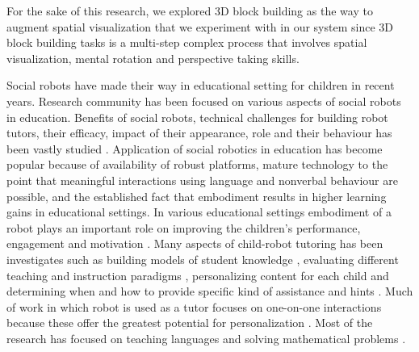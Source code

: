 \begin{enumerate}
\end{enumerate}
For the sake of this research, we explored 3D block building as the way to augment spatial visualization that we experiment with in our system since 3D block building tasks is a multi-step complex process that involves spatial visualization, mental rotation and perspective taking skills.


Social robots have made their way in educational setting for children in recent years. Research community has been focused on various aspects of social robots in education. Benefits of social robots, technical challenges for building robot tutors, their efficacy, impact of their appearance, role and their behaviour has been vastly studied \parencite{belpaeme2018social}. Application of social robotics in education has become popular because of availability of robust platforms, mature technology to the point that meaningful interactions using language and nonverbal behaviour are possible, and the established fact that embodiment results in higher learning gains in educational settings. In various educational settings embodiment of a robot plays an important role on improving the children's performance, engagement and motivation \parencite{kose2015effect} \parencite{kennedy2015comparing}. Many aspects of child-robot tutoring has been investigates such as building models of student knowledge \parencite{spaulding2016affect}, evaluating different teaching and instruction paradigms \parencite{hood2015children}, personalizing content for each child \parencite{gordon2016affective} and determining when and how to provide specific kind of assistance and hints \parencite{ramachandran2016shaping}. Much of work in which robot is used as a tutor focuses on one-on-one interactions because these offer the greatest potential for personalization \parencite{belpaeme2018social} \parencite{ramachandran2019personalized}. Most of the research has focused on teaching languages \parencite{gordon2016affective} and solving mathematical problems \parencite{ramachandran2019personalized}. 


